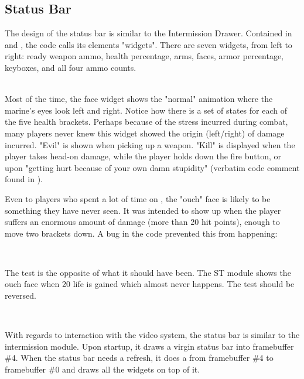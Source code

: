 \par

\subsection{Status Bar}
The design of the status bar is similar to the Intermission Drawer. Contained in  and , the code calls its elements "widgets". There are seven widgets, from left to right: ready weapon ammo, health percentage, arms, faces, armor percentage, keyboxes, and all four ammo counts.\\
\par
{}
\par

\par
{}\\
Most of the time, the face widget shows the "normal" animation where the marine's eyes look left and right. Notice how there is a set of states for each of the five health brackets. Perhaps because of the stress incurred during combat, many players never knew this widget showed the origin (left/right) of damage incurred. "Evil" is shown when picking up a weapon. "Kill" is displayed when the player takes head-on damage, while the player holds down the fire button, or upon "getting hurt because of your own damn stupidity" (verbatim code comment found in ).\\
\par
Even to players who spent a lot of time on \doom, the "ouch" face is likely to be something they have never seen. It was intended to show up when the player suffers an enormous amount of damage (more than 20 hit points), enough to move two brackets down. A bug in the code prevented this from happening:\\
\par
{}\\
\par
The test is the opposite of what it should have been. The ST module shows the ouch face when 20 life is gained which almost never happens. The test should be reversed.\\
\par
{}\\
\par
With regards to interaction with the video system, the status bar is similar to the intermission module. Upon startup, it draws a virgin status bar into framebuffer \#4. When the status bar needs a refresh, it does a  from framebuffer \#4 to framebuffer \#0 and draws all the widgets on top of it.\\
\par
{}
